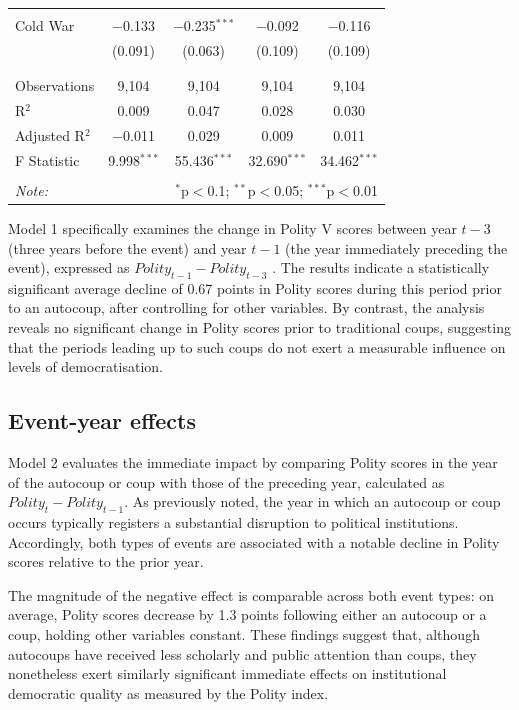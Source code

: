 \documentclass[
  12pt,
]{report}
\begin{document}
\begin{table}
{\begin{tabular}{@{\extracolsep{30pt}}lcccc}
  & & & & \\ 
 Cold War & $-$0.133 & $-$0.235$^{***}$ & $-$0.092 & $-$0.116 \\ 
  & (0.091) & (0.063) & (0.109) & (0.109) \\ 
  & & & & \\ 
\hline \\[-1.8ex] 
Observations & 9,104 & 9,104 & 9,104 & 9,104 \\ 
R$^{2}$ & 0.009 & 0.047 & 0.028 & 0.030 \\ 
Adjusted R$^{2}$ & $-$0.011 & 0.029 & 0.009 & 0.011 \\ 
F Statistic & 9.998$^{***}$ & 55.436$^{***}$ & 32.690$^{***}$ & 34.462$^{***}$ \\ 
\hline 
\hline \\[-1.8ex] 
\textit{Note:}  & \multicolumn{4}{r}{$^{*}$p$<$0.1; $^{**}$p$<$0.05; $^{***}$p$<$0.01} \\ 
\end{tabular}

}

\end{table}%

Model 1 specifically examines the change in Polity V scores between year
\(t−3\) (three years before the event) and year \(t−1\) (the year
immediately preceding the event), expressed as
\(Polity_{t−1} - Polity_{t−3}\) . The results indicate a statistically
significant average decline of 0.67 points in Polity scores during this
period prior to an autocoup, after controlling for other variables. By
contrast, the analysis reveals no significant change in Polity scores
prior to traditional coups, suggesting that the periods leading up to
such coups do not exert a measurable influence on levels of
democratisation.

\subsection{Event-year effects}\label{event-year-effects}

Model 2 evaluates the immediate impact by comparing Polity scores in the
year of the autocoup or coup with those of the preceding year,
calculated as \(Polity_{t} - Polity_{t-1}\). As previously noted, the
year in which an autocoup or coup occurs typically registers a
substantial disruption to political institutions. Accordingly, both
types of events are associated with a notable decline in Polity scores
relative to the prior year.

The magnitude of the negative effect is comparable across both event
types: on average, Polity scores decrease by 1.3 points following either
an autocoup or a coup, holding other variables constant. These findings
suggest that, although autocoups have received less scholarly and public
attention than coups, they nonetheless exert similarly significant
immediate effects on institutional democratic quality as measured by the
Polity index.
\end{document}

